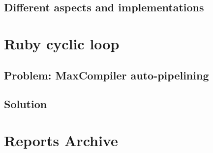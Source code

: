 \documentclass[a4paper, 10pt]{article}
\begin{document}
\subsection{Different aspects and implementations}

\section{Ruby cyclic loop}

\subsection{Problem: MaxCompiler auto-pipelining}

\subsection{Solution}


\newpage

\section{Reports Archive}
 \newpage
 \newpage
   
\end{document}
